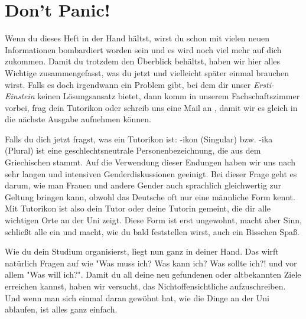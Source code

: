 %
%

\chapter{Don't Panic!}

Wenn du dieses Heft in der Hand hältst, wirst du schon mit vielen neuen Informationen bombardiert worden sein und es wird noch viel mehr auf dich zukommen. Damit du trotzdem den Überblick behältst, haben wir hier alles Wichtige zusammengefasst, was du jetzt und vielleicht später einmal brauchen wirst. Falls es doch irgendwann ein Problem gibt, bei dem dir unser \emph{Ersti-Einstein} keinen Lösungsansatz bietet, dann komm in unserem Fachschaftszimmer vorbei, frag dein Tutorikon oder schreib uns eine Mail an , damit wir es gleich in die nächste Ausgabe aufnehmen können. 

Falls du dich jetzt fragst, was ein Tutorikon ist: -ikon (Singular) bzw. -ika (Plural) ist eine geschlechtsneutrale Personenbezeichnung, die aus dem Griechischen stammt. Auf die Verwendung dieser Endungen haben wir uns nach sehr langen und intensiven Genderdiskussionen geeinigt. Bei dieser Frage geht es darum, wie man Frauen und andere Gender auch sprachlich gleichwertig zur Geltung bringen kann, obwohl das Deutsche oft nur eine männliche Form kennt. Mit Tutorikon ist also dein Tutor oder deine Tutorin gemeint, die dir alle wichtigen Orte an der Uni zeigt. Diese Form ist erst ungewohnt, macht aber Sinn, schließt alle ein und macht, wie du bald feststellen wirst, auch ein Bisschen Spaß.

Wie du dein Studium organisierst, liegt nun ganz in deiner Hand. Das wirft natürlich Fragen auf wie "Was muss ich? Was kann ich? Was sollte ich?! und vor allem "Was will ich?". Damit du all deine neu gefundenen oder altbekannten Ziele erreichen kannst, haben wir versucht, das Nichtoffensichtliche aufzuschreiben. Und wenn man sich einmal daran gewöhnt hat, wie die Dinge an der Uni ablaufen, ist alles ganz einfach.

